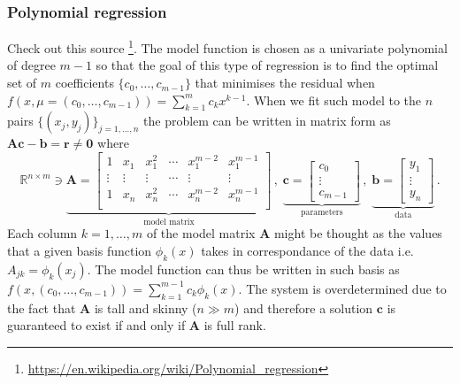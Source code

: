 \documentclass[../main.tex]{subfiles}
\begin{document}
\subsubsection{Polynomial regression}\label{subsubsec1.1.1}
Check out this source \footnote{\url{https://en.wikipedia.org/wiki/Polynomial_regression}}.
The model function is chosen as a univariate polynomial of degree $m-1$ so that the goal of this type of regression is to find the optimal set of $m$ coefficients $\{c_{0},\dots,c_{m-1}\}$ that minimises the residual when $f(x,\mu=(c_{0},\dots,c_{m-1})) = \sum_{k=1}^{m}c_{k}x^{k-1}$.
When we fit such model to the $n$ pairs $\{(x_{j},y_{j})\}_{j=1,\dots,n}$ the problem can be written in matrix form as $\boldsymbol{Ac}-\boldsymbol{b}=\boldsymbol{r}\neq \boldsymbol{0}$ where
\begin{equation*}
        \mathbb{R}^{n\times m}\ni\underbrace{\boldsymbol{A} = \begin{bmatrix}
                        1 & x_{1} & x_{1}^{2} & \cdots & x_{1}^{m-2} & x_{1}^{m-1} \\
                        \vdots &\vdots & \vdots & \cdots & \vdots & \vdots \\
                        1 & x_{n} & x_{n}^{2} & \cdots & x_{n}^{m-2} & x_{n}^{m-1} \\
        \end{bmatrix}}_{\text{model matrix}}\,,\;\underbrace{\boldsymbol{c} = \begin{bmatrix}
                c_{0} \\
                \vdots \\
                c_{m-1}
        \end{bmatrix}}_{\text{parameters}}\,,\;\underbrace{\boldsymbol{b} = \begin{bmatrix}
                y_{1} \\
                \vdots \\
                y_{n}
\end{bmatrix}}_{\text{data}}\,.
\end{equation*}
Each column $k=1,\dots,m$ of the model matrix $\boldsymbol{A}$ might be thought as the values that a given basis function $\phi_{k}(x)$ takes in correspondance of the data i.e. $A_{jk} = \phi_{k}(x_{j})$.
The model function can thus be written in such basis as $f(x, (c_{0},\dots,c_{m-1})) = \sum_{k=1}^{m-1}c_{k}\phi_{k}(x)$.
The system is overdetermined due to the fact that $\boldsymbol{A}$ is tall and skinny ($n\gg m$) and therefore a solution $\boldsymbol{c}$ is guaranteed to exist if and only if $\boldsymbol{A}$ is full rank.
\end{document}
